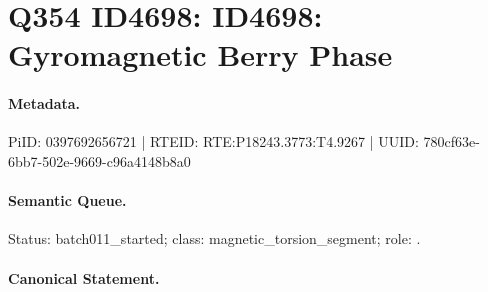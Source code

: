 \section*{Q354 ID4698: ID4698: Gyromagnetic Berry Phase}
\paragraph{Metadata.}
PiID: 0397692656721 | RTEID: RTE:P18243.3773:T4.9267 | UUID: 780cf63e-6bb7-502e-9669-c96a4148b8a0

\paragraph{Semantic Queue.}
Status: batch011\_started; class: magnetic\_torsion\_segment; role: .

\paragraph{Canonical Statement.}
